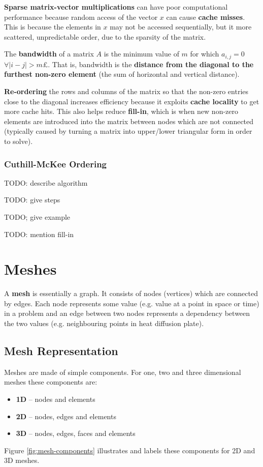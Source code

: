 \documentclass{article}
\begin{document}
\textbf{Sparse matrix-vector multiplications} can have poor computational performance because random access of the vector $x$ can cause \textbf{cache misses}. This is because the elements in $x$ may not be accessed sequentially, but it more scattered, unpredictable order, due to the sparsity of the matrix.

The \textbf{bandwidth} of a matrix $A$ is the minimum value of $m$ for which $a_{i,j} = 0$ $\forall |i - j| > m$£. That is, bandwidth is the \textbf{distance from the diagonal to the furthest non-zero element} (the sum of horizontal and vertical distance).

\textbf{Re-ordering} the rows and columns of the matrix so that the non-zero entries close to the diagonal increases efficiency because it exploits \textbf{cache locality} to get more cache hits. This also helps reduce \textbf{fill-in}, which is when new non-zero elements are introduced into the matrix between nodes which are not connected (typically caused by turning a matrix into upper/lower triangular form in order to solve).

\subsubsection{Cuthill-McKee Ordering}

TODO: describe algorithm

TODO: give steps

TODO; give example

TODO: mention fill-in

\section{Meshes}

A \textbf{mesh} is essentially a graph. It consists of nodes (vertices) which are connected by edges. Each node represents some value (e.g. value at a point in space or time) in a problem and an edge between two nodes represents a dependency between the two values (e.g. neighbouring points in heat diffusion plate).

\subsection{Mesh Representation}
\label{sec:mesh-representation}

Meshes are made of simple components. For one, two and three dimensional meshes these components are:
\begin{itemize}
	\item \textbf{1D} -- nodes and elements
	\item \textbf{2D} -- nodes, edges and elements
	\item \textbf{3D} -- nodes, edges, faces and elements
\end{itemize}
Figure \ref{fig:mesh-components} illustrates and labels these components for 2D and 3D meshes.
\end{document}
